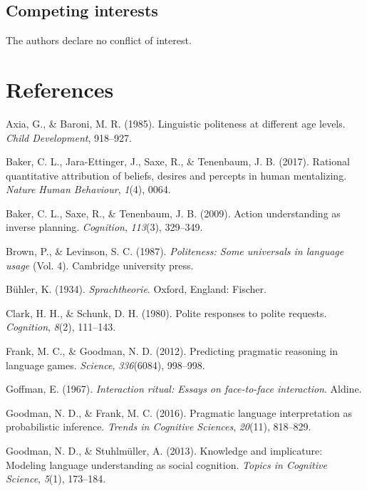 \documentclass[floatsintext,man]{apa6}
\theoremstyle{definition}
\theoremstyle{definition}
\theoremstyle{definition}
\theoremstyle{remark}
\begin{document}
\subsection{Competing interests}\label{competing-interests}

The authors declare no conflict of interest.

\newpage

\section{References}\label{references}

\setlength{\parindent}{-0.5in} \setlength{\leftskip}{0.5in}

\hypertarget{refs}{}
\hypertarget{ref-axia1985}{}
Axia, G., \& Baroni, M. R. (1985). Linguistic politeness at different
age levels. \emph{Child Development}, 918--927.

\hypertarget{ref-baker2017rational}{}
Baker, C. L., Jara-Ettinger, J., Saxe, R., \& Tenenbaum, J. B. (2017).
Rational quantitative attribution of beliefs, desires and percepts in
human mentalizing. \emph{Nature Human Behaviour}, \emph{1}(4), 0064.

\hypertarget{ref-baker2009action}{}
Baker, C. L., Saxe, R., \& Tenenbaum, J. B. (2009). Action understanding
as inverse planning. \emph{Cognition}, \emph{113}(3), 329--349.

\hypertarget{ref-brown1987}{}
Brown, P., \& Levinson, S. C. (1987). \emph{Politeness: Some universals
in language usage} (Vol. 4). Cambridge university press.

\hypertarget{ref-buhler1934}{}
Bühler, K. (1934). \emph{Sprachtheorie}. Oxford, England: Fischer.

\hypertarget{ref-clark1980}{}
Clark, H. H., \& Schunk, D. H. (1980). Polite responses to polite
requests. \emph{Cognition}, \emph{8}(2), 111--143.

\hypertarget{ref-frank2012}{}
Frank, M. C., \& Goodman, N. D. (2012). Predicting pragmatic reasoning
in language games. \emph{Science}, \emph{336}(6084), 998--998.

\hypertarget{ref-goffman1967}{}
Goffman, E. (1967). \emph{Interaction ritual: Essays on face-to-face
interaction}. Aldine.

\hypertarget{ref-goodman2016}{}
Goodman, N. D., \& Frank, M. C. (2016). Pragmatic language
interpretation as probabilistic inference. \emph{Trends in Cognitive
Sciences}, \emph{20}(11), 818--829.

\hypertarget{ref-goodman2013}{}
Goodman, N. D., \& Stuhlmüller, A. (2013). Knowledge and implicature:
Modeling language understanding as social cognition. \emph{Topics in
Cognitive Science}, \emph{5}(1), 173--184.
\end{document}
